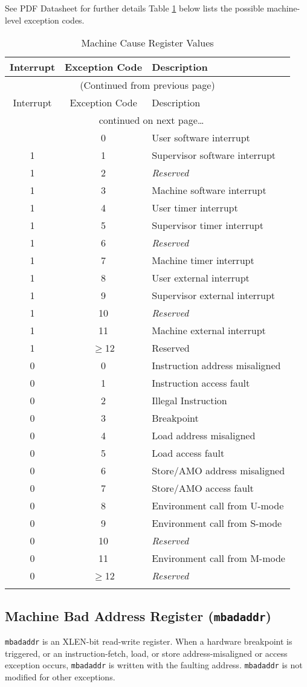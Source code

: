\ifdefined\MARKDOWN
See PDF Datasheet for further details
\else
Table \ref{tab:mcause-reg-values} below lists the possible machine-level exception codes.

\begin{longtable}[]{@{}ccl@{}}
\toprule
Interrupt & Exception Code & Description\tabularnewline
\midrule
\endfirsthead
\multicolumn{3}{c}{{(Continued from previous page)}} \\

\toprule
Interrupt & Exception Code & Description\tabularnewline
\midrule
\endhead

\midrule \multicolumn{3}{c}{{\tablename\ \thetable{} continued on next page\ldots}} \\
\endfoot

\endlastfoot
1 & 0 & User software interrupt\tabularnewline
1 & 1 & Supervisor software interrupt\tabularnewline
1 & 2 & \emph{Reserved}\tabularnewline
1 & 3 & Machine software interrupt\tabularnewline
1 & 4 & User timer interrupt\tabularnewline
1 & 5 & Supervisor timer interrupt\tabularnewline
1 & 6 & \emph{Reserved}\tabularnewline
1 & 7 & Machine timer interrupt\tabularnewline
1 & 8 & User external interrupt\tabularnewline
1 & 9 & Supervisor external interrupt\tabularnewline
1 & 10 & \emph{Reserved}\tabularnewline
1 & 11 & Machine external interrupt\tabularnewline
1 & $\geqslant$12 & Reserved\tabularnewline
\midrule
0 & 0 & Instruction address misaligned\tabularnewline
0 & 1 & Instruction access fault\tabularnewline
0 & 2 & Illegal Instruction\tabularnewline
0 & 3 & Breakpoint\tabularnewline
0 & 4 & Load address misaligned\tabularnewline
0 & 5 & Load access fault\tabularnewline
0 & 6 & Store/AMO address misaligned\tabularnewline
0 & 7 & Store/AMO access fault\tabularnewline
0 & 8 & Environment call from U-mode\tabularnewline
0 & 9 & Environment call from S-mode\tabularnewline
0 & 10 & \emph{Reserved}\tabularnewline
0 & 11 & Environment call from M-mode\tabularnewline
0 & $\geqslant$12 & \emph{Reserved}\tabularnewline
\bottomrule
\caption{Machine Cause Register Values}
\label{tab:mcause-reg-values}
\end{longtable}

\fi

\subsection{Machine Bad Address Register
(\texttt{mbadaddr})}\label{machine-bad-address-register-mbadaddr}

\texttt{mbadaddr} is an XLEN-bit read-write register. When a hardware breakpoint
is triggered, or an instruction-fetch, load, or store address-misaligned
or access exception occurs, \texttt{mbadaddr} is written with the faulting
address. \texttt{mbadaddr} is not modified for other exceptions.


